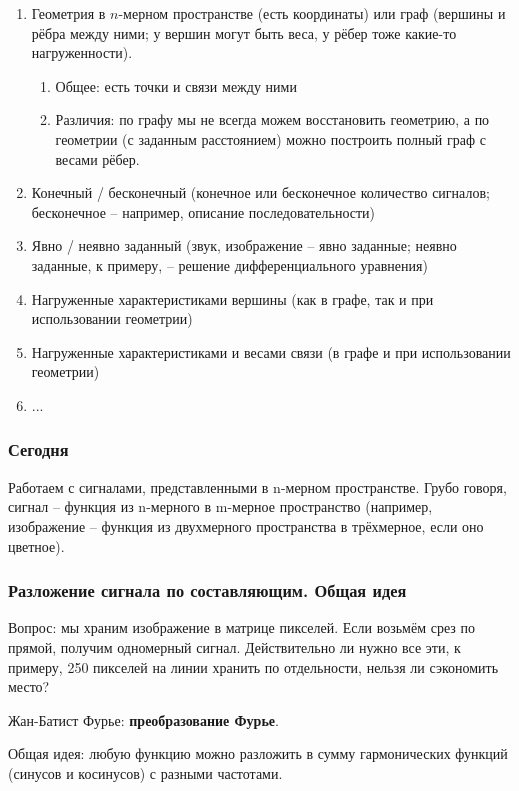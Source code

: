 \documentclass[main.tex]{subfiles}
\begin{document}
\begin{enumerate}[noitemsep]
	\item Геометрия в $n$-мерном пространстве (есть координаты) или граф (вершины и рёбра между ними; у вершин могут быть веса, у рёбер тоже какие-то нагруженности).
	\begin{enumerate}[noitemsep]
		\item Общее: есть точки и связи между ними
		\item Различия: по графу мы не всегда можем восстановить геометрию, а по геометрии (с заданным расстоянием) можно построить полный граф с весами рёбер.
	\end{enumerate}
	\item Конечный / бесконечный (конечное или бесконечное количество сигналов; бесконечное -- например, описание последовательности)
	\item Явно / неявно заданный (звук, изображение -- явно заданные; неявно заданные, к примеру, -- решение дифференциального уравнения)
	\item Нагруженные характеристиками вершины (как в графе, так и при использовании геометрии)
	\item Нагруженные характеристиками и весами связи (в графе и при использовании геометрии)
	\item ...
\end{enumerate}

\subsubsection{Сегодня}

Работаем с сигналами, представленными в n-мерном пространстве.
Грубо говоря, сигнал -- функция из n-мерного в m-мерное пространство (например, изображение -- функция из двухмерного пространства в трёхмерное, если оно цветное).
	
\subsubsection{Разложение сигнала по составляющим. Общая идея}
Вопрос: мы храним изображение в матрице пикселей.
Если возьмём срез по прямой, получим одномерный сигнал.
Действительно ли нужно все эти, к примеру, 250 пикселей на линии хранить по отдельности, нельзя ли сэкономить место?

Жан-Батист Фурье: \textbf{преобразование Фурье}.

Общая идея: любую функцию можно разложить в сумму гармонических функций (синусов и косинусов) с разными частотами.
\end{document}
